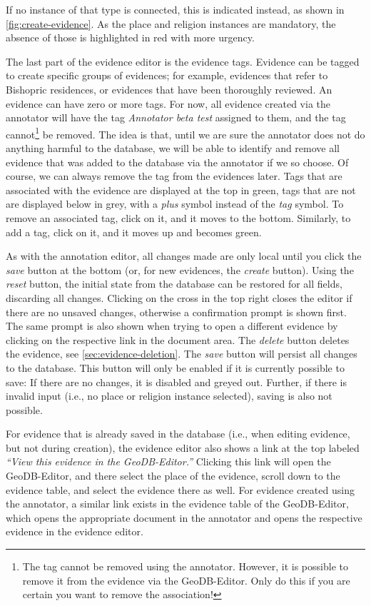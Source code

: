 If no instance of that type is connected, this is indicated instead, as shown in \cref{fig:create-evidence}.
As the place and religion instances are mandatory, the absence of those is highlighted in red with more urgency.

The last part of the evidence editor is the evidence tags.
Evidence can be tagged to create specific groups of evidences;
for example, evidences that refer to Bishopric residences, or evidences that have been thoroughly reviewed.
An evidence can have zero or more tags.
For now, all evidence created via the annotator will have the tag \emph{Annotator beta test} assigned to them, and the tag cannot\footnote{
  The tag cannot be removed using the annotator.
  However, it is possible to remove it from the evidence via the GeoDB-Editor.
  Only do this if you are certain you want to remove the association!
} be removed.
The idea is that, until we are sure the annotator does not do anything harmful to the database, we will be able to identify and remove all evidence that was added to the database via the annotator if we so choose.
Of course, we can always remove the tag from the evidences later.
Tags that are associated with the evidence are displayed at the top in green, tags that are not are displayed below in grey, with a \emph{plus} symbol instead of the \emph{tag} symbol.
To remove an associated tag, click on it, and it moves to the bottom.
Similarly, to add a tag, click on it, and it moves up and becomes green.

As with the annotation editor, all changes made are only local until you click the \emph{save} button at the bottom (or, for new evidences, the \emph{create} button).
Using the \emph{reset} button, the initial state from the database can be restored for all fields, discarding all changes.
Clicking on the cross in the top right closes the editor if there are no unsaved changes, otherwise a confirmation prompt is shown first.
The same prompt is also shown when trying to open a different evidence by clicking on the respective link in the document area.
The \emph{delete} button deletes the evidence, see \cref{sec:evidence-deletion}.
The \emph{save} button will persist all changes to the database.
This button will only be enabled if it is currently possible to save:
If there are no changes, it is disabled and greyed out.
Further, if there is invalid input (i.e., no place or religion instance selected), saving is also not possible.

For evidence that is already saved in the database (i.e., when editing evidence, but not during creation), the evidence editor also shows a link at the top labeled \emph{\enquote{View this evidence in the GeoDB-Editor.}}
Clicking this link will open the GeoDB-Editor, and there select the place of the evidence, scroll down to the evidence table, and select the evidence there as well.
For evidence created using the annotator, a similar link exists in the evidence table of the GeoDB-Editor, which opens the appropriate document in the annotator and opens the respective evidence in the evidence editor.


